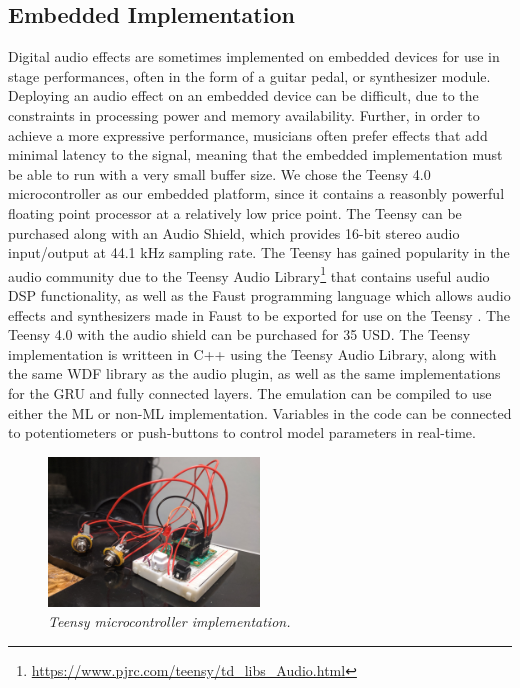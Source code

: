 \documentclass[twoside,a4paper]{article}
\begin{document}
\subsection{Embedded Implementation}
Digital audio effects are sometimes implemented on embedded devices
for use in stage performances, often in the form of a guitar pedal,
or synthesizer module. Deploying an audio effect on an embedded device
can be difficult, due to the constraints in processing power and memory
availability. Further, in order to achieve a more expressive performance,
musicians often prefer effects that add minimal latency to the signal,
meaning that the embedded implementation must be able to run with a
very small buffer size.
\newline\newline
We chose the Teensy 4.0 microcontroller as our embedded platform, since
it contains a reasonbly powerful floating point processor at a relatively
low price point. The Teensy can be purchased along with an Audio Shield,
which provides 16-bit stereo audio input/output at 44.1 kHz sampling rate.
The Teensy has gained popularity in the audio community due to
the Teensy Audio Library\footnote{\url{https://www.pjrc.com/teensy/td_libs_Audio.html}}
that contains useful audio DSP functionality, as well as the Faust
programming language which allows audio effects and synthesizers made in
Faust to be exported for use on the Teensy \cite{Michon2019RealTA}.
The Teensy 4.0 with the audio shield can be purchased for 35 USD.
\newline\newline
The Teensy implementation is writteen in C++ using the Teensy Audio Library,
along with the same WDF library as the audio plugin, as well as the same
implementations for the GRU and fully connected layers. The emulation
can be compiled to use either the ML or non-ML implementation. Variables
in the code can be connected to potentiometers or push-buttons to
control model parameters in real-time.
%
\begin{figure}
    \centering
    \includegraphics[width=0.5\textwidth]{Teensy.jpg}
    \caption{\label{fig:Teensy} {\it Teensy microcontroller implementation.}}
\end{figure}
\end{document}
